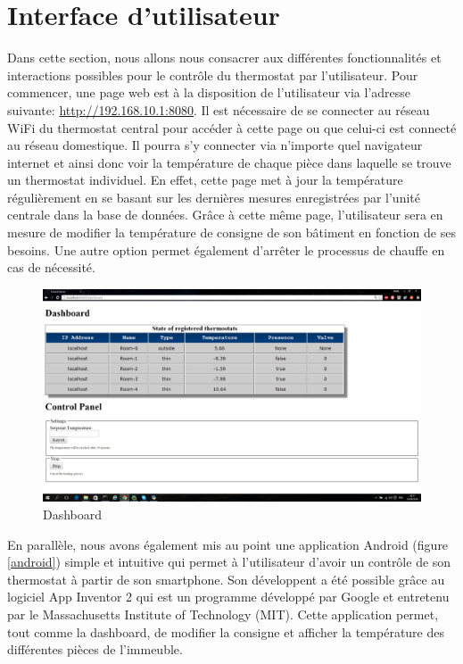 \documentclass[12pt]{report}
\begin{document}
\section{Interface d'utilisateur}
Dans cette section, nous allons nous consacrer aux différentes fonctionnalités et interactions possibles pour le contrôle du thermostat par l'utilisateur. Pour commencer, une page web est à la disposition de l'utilisateur via l'adresse suivante: \url{http://192.168.10.1:8080}. Il est nécessaire de se connecter au réseau WiFi du thermostat central pour accéder à cette page ou que celui-ci est connecté au réseau domestique.
Il pourra s'y connecter via n'importe quel navigateur internet et ainsi donc voir la température de chaque pièce dans laquelle se trouve un thermostat individuel. En effet, cette page met à jour la température régulièrement en se basant sur les dernières mesures enregistrées par l'unité centrale dans la base de données. Grâce à cette même page, l'utilisateur sera en mesure de modifier la température de consigne de son bâtiment en fonction de ses besoins. Une autre option permet également d'arrêter le processus de chauffe en cas de nécessité.\\
\vspace{2cm}
\begin{figure}[H]
\centering
\includegraphics[scale = 0.3]{dashboard.png}
\caption{\label{dashboard} Dashboard}
\end{figure}

\newpage
\noindent
En parallèle, nous avons également mis au point une application Android (figure \ref{android}) simple et intuitive qui permet à l'utilisateur d'avoir un contrôle de son thermostat à partir de son smartphone. Son développent a été possible grâce au logiciel App Inventor 2 \cite{_mit_????} qui est un programme développé par Google et entretenu par le Massachusetts Institute of Technology (MIT). Cette application permet, tout comme la dashboard, de modifier la consigne et afficher la température des différentes pièces de l'immeuble.
\end{document}
